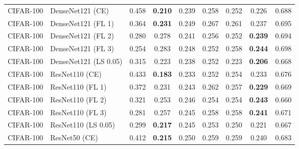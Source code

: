 \begin{table}[h!]
{\begin{tabular}{llccccccc}
   CIFAR-100 &            DenseNet121 (CE) &         0.458 & \textbf{0.210} &                  0.239 &                  0.258 &                  0.252 &                  0.226 &                  0.688 \\
   CIFAR-100 &          DenseNet121 (FL 1) &         0.364 & \textbf{0.231} &                  0.249 &                  0.267 &                  0.261 &                  0.237 &                  0.695 \\
   CIFAR-100 &          DenseNet121 (FL 2) &         0.280 &                  0.278 &                  0.241 &                  0.256 &                  0.252 & \textbf{0.239} &                  0.694 \\
   CIFAR-100 &          DenseNet121 (FL 3) &         0.254 &                  0.283 &                  0.248 &                  0.252 &                  0.258 & \textbf{0.244} &                  0.698 \\
   CIFAR-100 &       DenseNet121 (LS 0.05) &         0.315 &                  0.223 &                  0.238 &                  0.252 &                  0.223 & \textbf{0.206} &                  0.668 \\
   CIFAR-100 &              ResNet110 (CE) &         0.433 & \textbf{0.183} &                  0.233 &                  0.252 &                  0.254 &                  0.233 &                  0.676 \\
   CIFAR-100 &            ResNet110 (FL 1) &         0.372 &                  0.231 &                  0.243 &                  0.262 &                  0.257 & \textbf{0.229} &                  0.669 \\
   CIFAR-100 &            ResNet110 (FL 2) &         0.321 &                  0.253 &                  0.246 &                  0.254 &                  0.254 & \textbf{0.243} &                  0.660 \\
   CIFAR-100 &            ResNet110 (FL 3) &         0.281 &                  0.257 &                  0.245 &                  0.258 &                  0.258 & \textbf{0.241} &                  0.671 \\
   CIFAR-100 &         ResNet110 (LS 0.05) &         0.299 & \textbf{0.217} &                  0.245 &                  0.253 &                  0.250 &                  0.221 &                  0.667 \\
   CIFAR-100 &               ResNet50 (CE) &         0.412 & \textbf{0.215} &                  0.250 &                  0.259 &                  0.259 &                  0.240 &                  0.683 \\

\end{tabular}}
\end{table}
